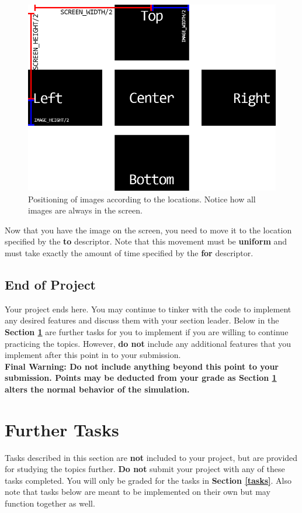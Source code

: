 \documentclass[a4paper]{article}
\begin{document}
	\begin{figure}[!htb]
		\centering
		\includegraphics[width=1\textwidth]{../img/image_placement.png}
		\caption{Positioning of images according to the locations. Notice how all images are always in the screen.}
	\end{figure}
	
	Now that you have the image on the screen, you need to move it to the location specified by the \textbf{to} descriptor. Note that this movement must be \textbf{uniform} and must take exactly the amount of time specified by the \textbf{for} descriptor.
	
	
	\subsection{End of Project}
	Your project ends here. You may continue to tinker with the code to implement any desired features and discuss them with your section leader. Below in the \textbf{Section \ref{further}} are further tasks for you to implement if you are willing to continue practicing the topics. However, \textbf{do not} include any additional features that you implement after this point in to your submission.  
	\\
	
	\noindent \textbf{Final Warning: Do not include anything beyond this point to your submission. Points may be deducted from your grade as Section \ref{further} alters the normal behavior of the simulation.} 
	
	\section{Further Tasks}
	\label{further}
	Tasks described in this section are \textbf{not} included to your project, but are provided for studying the topics further. \textbf{Do not} submit your project with any of these tasks completed. You will only be graded for the tasks in \textbf{Section \ref{tasks}}. Also note that tasks below are meant to be implemented on their own but may function together as well.
	
\end{document}
